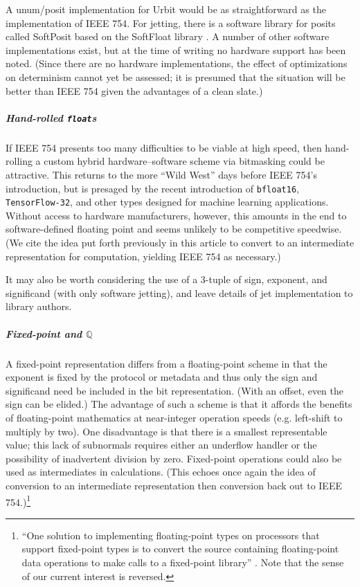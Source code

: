\documentclass[twoside]{article}
\begin{document}
\citep{Gustafson2015}
\citep{Gustafson2017}
\citep{Posit2022}
\citep{Risse2016}

A unum/posit implementation for Urbit would be as straightforward as the implementation of IEEE 754.  For jetting, there is a software library for posits called SoftPosit based on the SoftFloat library \citep{Cerlane2018}.  A number of other software implementations exist, but at the time of writing no hardware support has been noted.  (Since there are no hardware implementations, the effect of optimizations on determinism cannot yet be assessed; it is presumed that the situation will be better than IEEE 754 given the advantages of a clean slate.)

\subparagraph{Hand-rolled \texttt{float}s}

If IEEE 754 presents too many difficulties to be viable at high speed, then hand-rolling a custom hybrid hardware–software scheme via bitmasking could be attractive.  This returns to the more “Wild West” days before IEEE 754's introduction, but is presaged by the recent introduction of \texttt{bfloat16}, \texttt{TensorFlow-32}, and other types designed for machine learning applications.  Without access to hardware manufacturers, however, this amounts in the end to software-defined floating point and seems unlikely to be competitive speedwise.  (We cite the idea put forth previously in this article to convert to an intermediate representation for computation, yielding IEEE 754 as necessary.)

It may also be worth considering the use of a 3-tuple of sign, exponent, and significand (with only software jetting), and leave details of jet implementation to library authors.

\subparagraph{Fixed-point and $\mathbb{Q}$}

A fixed-point representation differs from a floating-point scheme in that the exponent is fixed by the protocol or metadata and thus only the sign and significand need be included in the bit representation.  (With an offset, even the sign can be elided.)  The advantage of such a scheme is that it affords the benefits of floating-point mathematics at near-integer operation speeds (e.g. left-shift to multiply by two).  One disadvantage is that there is a smallest representable value; this lack of subnormals requires either an underflow handler or the possibility of inadvertent division by zero.  Fixed-point operations could also be used as intermediates in calculations.  (This echoes once again the idea of conversion to an intermediate representation then conversion back out to IEEE 754.)\footnote{“One solution to implementing floating-point types on processors that support fixed-point types is to
convert the source containing floating-point data operations to make calls to a fixed-point library” \citep[p.~346]{Jones2008}.  Note that the sense of our current interest is reversed.}
\end{document}
